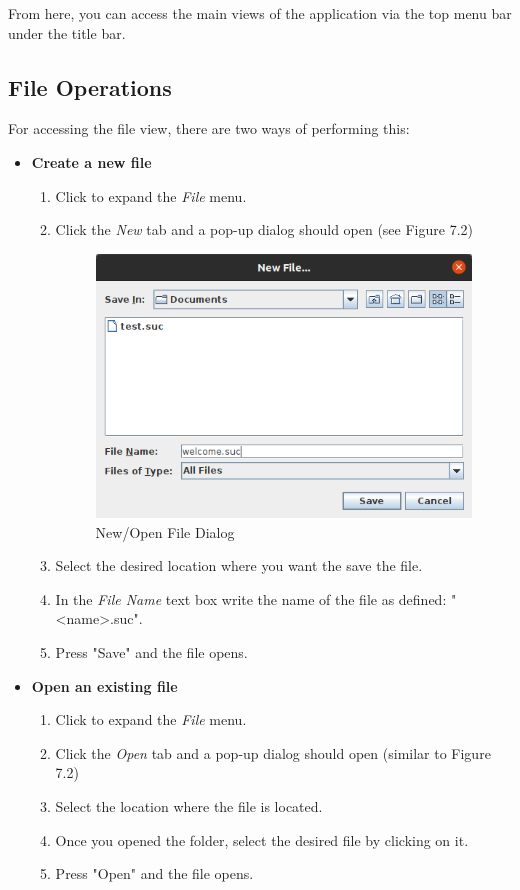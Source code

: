 \documentclass[12pt,a4paper,twoside]{report}
\begin{document}
From here, you can access the main views of the application via the top menu bar under the title bar.

\subsection{File Operations}
For accessing the file view, there are two ways of performing this:
\begin{itemize}
	\item \textbf{Create a new file}
	\begin{enumerate}
	\item Click to expand the \textit{File} menu.
	\item Click the \textit{New} tab and a pop-up dialog should open (see Figure 7.2)
	
\begin{figure}[H]
    \centering
    \includegraphics[width=0.45\linewidth]{img/userGuide/NewFileDialog.png}
    \caption{New/Open File Dialog}
    \label{fig:conf}
\end{figure}

	\item Select the desired location where you want the save the file.
	\item In the \textit{File Name} text box write the name of the file as defined: "<name>.suc".
	\item Press "Save" and the file opens.
	\end{enumerate}
	\item \textbf{Open an existing file}
	\begin{enumerate}
	\item Click to expand the \textit{File} menu.
	\item Click the \textit{Open} tab and a pop-up dialog should open (similar to Figure 7.2)
	\item Select the location where the file is located.
	\item Once you opened the folder, select the desired file by clicking on it.
	\item Press "Open" and the file opens.
	\end{enumerate}
\end{itemize}
\end{document}
